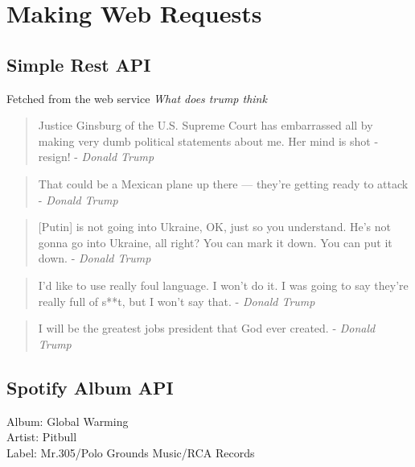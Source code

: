 \documentclass{article}
\begin{document}
  

  \section{Making Web Requests}
  \label{sec:Making Web Requests}

    \subsection{Simple Rest API}
    \label{sub:Simple Rest API}
      Fetched from the web service \textit{What does trump think}\\
                    \begin{quote}
          Justice Ginsburg of the U.S. Supreme Court has embarrassed all by making very dumb political statements about me. Her mind is shot - resign! - \textit{Donald Trump}
        \end{quote}
                    \begin{quote}
          That could be a Mexican plane up there — they're getting ready to attack - \textit{Donald Trump}
        \end{quote}
                    \begin{quote}
          [Putin] is not going into Ukraine, OK, just so you understand. He’s not gonna go into Ukraine, all right? You can mark it down. You can put it down. - \textit{Donald Trump}
        \end{quote}
                    \begin{quote}
          I'd like to use really foul language. I won't do it. I was going to say they're really full of s**t, but I won't say that. - \textit{Donald Trump}
        \end{quote}
                    \begin{quote}
          I will be the greatest jobs president that God ever created. - \textit{Donald Trump}
        \end{quote}
      

    \subsection{Spotify Album API}
    \label{sub:Spotify Album API}
        Album: Global Warming \\
    Artist: Pitbull \\
    Label: Mr.305/Polo Grounds Music/RCA Records \\
\end{document}
